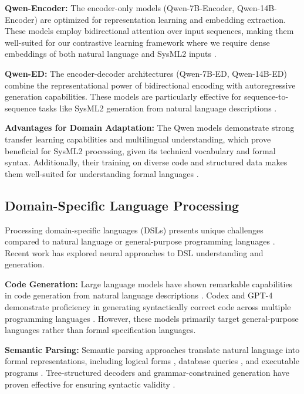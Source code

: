 \documentclass{article}
\begin{document}
\textbf{Qwen-Encoder:} The encoder-only models (Qwen-7B-Encoder, Qwen-14B-Encoder) are optimized for representation learning and embedding extraction. These models employ bidirectional attention over input sequences, making them well-suited for our contrastive learning framework where we require dense embeddings of both natural language and SysML2 inputs \cite{bai2023qwen}.

\textbf{Qwen-ED:} The encoder-decoder architectures (Qwen-7B-ED, Qwen-14B-ED) combine the representational power of bidirectional encoding with autoregressive generation capabilities. These models are particularly effective for sequence-to-sequence tasks like SysML2 generation from natural language descriptions \cite{bai2023qwen}.

\textbf{Advantages for Domain Adaptation:} The Qwen models demonstrate strong transfer learning capabilities and multilingual understanding, which prove beneficial for SysML2 processing, given its technical vocabulary and formal syntax. Additionally, their training on diverse code and structured data makes them well-suited for understanding formal languages \cite{bai2023qwen}.

\subsection{Domain-Specific Language Processing}

Processing domain-specific languages (DSLs) presents unique challenges compared to natural language or general-purpose programming languages \cite{mernik2005domain}. Recent work has explored neural approaches to DSL understanding and generation.

\textbf{Code Generation:} Large language models have shown remarkable capabilities in code generation from natural language descriptions \cite{chen2021evaluating, nijkamp2022codegen, li2023starcoder}. Codex and GPT-4 demonstrate proficiency in generating syntactically correct code across multiple programming languages \cite{chen2021evaluating, bubeck2023sparks}. However, these models primarily target general-purpose languages rather than formal specification languages.

\textbf{Semantic Parsing:} Semantic parsing approaches translate natural language into formal representations, including logical forms \cite{berant2013semantic}, database queries \cite{zhong2017seq2sql}, and executable programs \cite{yin2018tranx}. Tree-structured decoders and grammar-constrained generation have proven effective for ensuring syntactic validity \cite{yin2017syntactic, scholak2021picard}.
\end{document}

